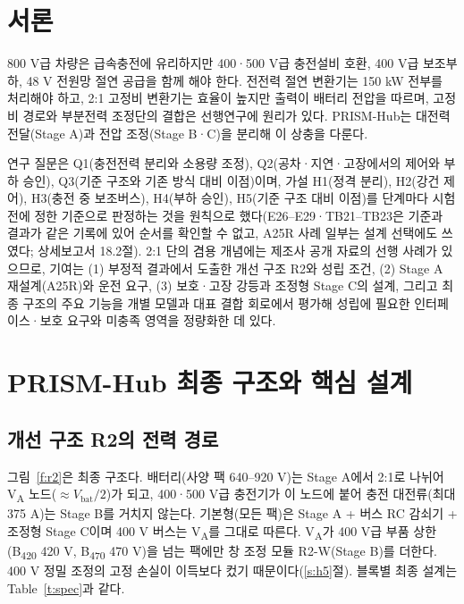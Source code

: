 
\chapter{서론}

800 V급 차량은 급속충전에 유리하지만\cite{b1} 400·500 V급 충전설비 호환, 400 V급 보조부하, 48 V 전원망 절연 공급을 함께 해야 한다. 전전력 절연 변환기는 150 kW 전부를 처리해야 하고\cite{b2}, 2:1 고정비 변환기는 효율이 높지만\cite{b3} 출력이 배터리 전압을 따르며, 고정비 경로와 부분전력 조정단의 결합은 선행연구에 원리가 있다\cite{b4}. PRISM-Hub는 대전력 전달(Stage A)과 전압 조정(Stage B·C)을 분리해 이 상충을 다룬다.

연구 질문은 Q1(충전전력 분리와 소용량 조정), Q2(공차·지연·고장에서의 제어와 부하 승인), Q3(기준 구조와 기존 방식 대비 이점)이며, 가설 H1(정격 분리), H2(강건 제어), H3(충전 중 보조버스), H4(부하 승인), H5(기준 구조 대비 이점)를 단계마다 시험 전에 정한 기준으로 판정하는 것을 원칙으로 했다(E26–E29·TB21–TB23은 기준과 결과가 같은 기록에 있어 순서를 확인할 수 없고, A25R 사례 일부는 설계 선택에도 쓰였다; 상세보고서 18.2절). 2:1 단의 겸용 개념에는 제조사 공개 자료의 선행 사례가 있으므로\cite{b35}, 기여는 (1) 부정적 결과에서 도출한 개선 구조 R2와 성립 조건, (2) Stage A 재설계(A25R)와 운전 요구, (3) 보호·고장 강등과 조정형 Stage C의 설계, 그리고 최종 구조의 주요 기능을 개별 모델과 대표 결합 회로에서 평가해 성립에 필요한 인터페이스·보호 요구와 미충족 영역을 정량화한 데 있다.

\chapter{PRISM-Hub 최종 구조와 핵심 설계}

\section{개선 구조 R2의 전력 경로}\label{s:r2}

그림~\ref{f:r2}은 최종 구조다. 배터리(사양 팩 640–920 V)는 Stage A에서 2:1로 나뉘어 V\textsubscript{A} 노드($\approx V_\mathrm{bat}/2$)가 되고, 400·500 V급 충전기가 이 노드에 붙어 충전 대전류(최대 375 A)는 Stage B를 거치지 않는다. 기본형(모든 팩)은 Stage A + 버스 RC 감쇠기 + 조정형 Stage C이며 400 V 버스는 V\textsubscript{A}를 그대로 따른다. V\textsubscript{A}가 400 V급 부품 상한(B\textsubscript{420} 420 V, B\textsubscript{470} 470 V)을 넘는 팩에만 창 조정 모듈 R2-W(Stage B)를 더한다. 400 V 정밀 조정의 고정 손실이 이득보다 컸기 때문이다(\ref{s:h5}절). 블록별 최종 설계는 Table~\ref{t:spec}과 같다.



